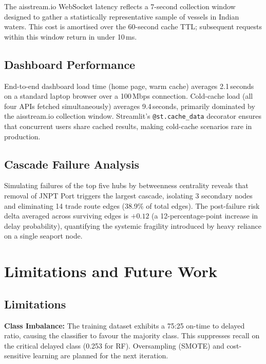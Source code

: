 \documentclass[conference]{IEEEtran}
\begin{document}
The aisstream.io WebSocket latency reflects a 7-second collection
window designed to gather a statistically representative sample of
vessels in Indian waters. This cost is amortised over the 60-second
cache TTL; subsequent requests within this window return in under 10\,ms.

\subsection{Dashboard Performance}

End-to-end dashboard load time (home page, warm cache) averages
2.1\,seconds on a standard laptop browser over a 100\,Mbps connection.
Cold-cache load (all four APIs fetched simultaneously) averages
9.4\,seconds, primarily dominated by the aisstream.io collection
window. Streamlit's \texttt{@st.cache\_data} decorator ensures that
concurrent users share cached results, making cold-cache scenarios
rare in production.

\subsection{Cascade Failure Analysis}

Simulating failures of the top five hubs by betweenness centrality
reveals that removal of JNPT Port triggers the largest cascade,
isolating 3 secondary nodes and eliminating 14 trade route edges
(38.9\% of total edges). The post-failure risk delta averaged across
surviving edges is $+0.12$ (a 12-percentage-point increase in delay
probability), quantifying the systemic fragility introduced by heavy
reliance on a single seaport node.


\section{Limitations and Future Work}

\subsection{Limitations}

\textbf{Class Imbalance:} The training dataset exhibits a 75:25
on-time to delayed ratio, causing the classifier to favour the
majority class. This suppresses recall on the critical delayed
class (0.253 for RF). Oversampling (SMOTE) and cost-sensitive
learning are planned for the next iteration.
\end{document}
